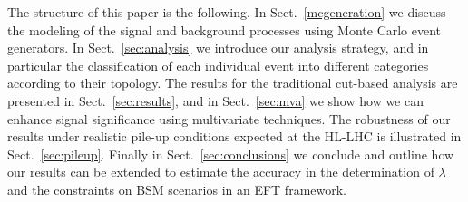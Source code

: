 The structure of this paper is the following.
%
In Sect.~\ref{mcgeneration} we discuss the modeling of the signal
and background processes using Monte Carlo event generators.
%
In Sect.~\ref{sec:analysis}
we introduce our analysis strategy, and in particular
the classification of each individual event into
different categories according to their topology.
%
The results for the traditional cut-based analysis
are presented in Sect.~\ref{sec:results}, and in
Sect.~\ref{sec:mva} we show how we can enhance signal
significance using multivariate techniques.
%
The robustness of our results under realistic pile-up
conditions expected at the HL-LHC is illustrated in
 Sect.~\ref{sec:pileup}.
%
Finally in Sect.~\ref{sec:conclusions} we conclude and outline
how our results can be extended to estimate the accuracy
in the determination of $\lambda$ and the constraints on
BSM scenarios in an EFT framework.
